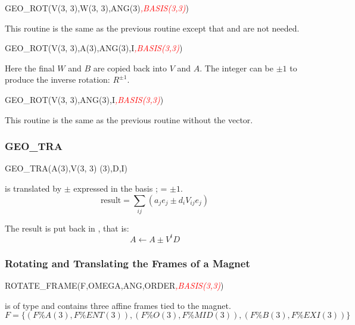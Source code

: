 \begin{ptccode}
GEO_ROT(V(3, 3),W(3, 3),ANG(3)\textit{\textcolor{red}{,BASIS(3,3)}})
\end{ptccode}

This routine is the same as the previous routine except that
 and  are not needed.

\begin{ptccode}
GEO_ROT(V(3, 3),A(3),ANG(3),I\textit{\textcolor{red}{,BASIS(3,3)}})
\end{ptccode}

Here the final $W$ and $B$ are copied back into $V$ and $A$. The
integer  can be $\pm1$ to produce the inverse rotation: $R^{\pm1}$.

\begin{ptccode}
GEO_ROT(V(3, 3),ANG(3),I\textit{\textcolor{red}{,BASIS(3,3)}})
\end{ptccode}

This routine is the same as the previous routine without the  vector.


\subsubsection{GEO_TRA}

\begin{ptccode}
GEO_TRA(A(3),V(3, 3) (3),D,I)
\end{ptccode}

%
 is translated by $\pm$  expressed in the basis ;  = $\pm1$.
\begin{equation*}
  \text{result} = \sum_{ij} (a_j e_j \pm d_i V_{ij} e_j)
\end{equation*}

The result is put back in , that is:
\begin{equation*}
  A \leftarrow A \pm V^t D
\end{equation*}


\subsubsection{Rotating and Translating the Frames of a Magnet}

\begin{ptccode}
ROTATE_FRAME(F,OMEGA,ANG,ORDER\textit{\textcolor{red}{,BASIS(3,3)}})
\end{ptccode}

%
 is of type  and contains three affine frames tied
to the magnet.
\begin{equation*}
F = \lbrace ( F \% A(3), F \% ENT(3) ), ( F \% O(3), F \% MID(3) ), ( F \% B(3), F \% EXI(3) ) \rbrace
\end{equation*}

